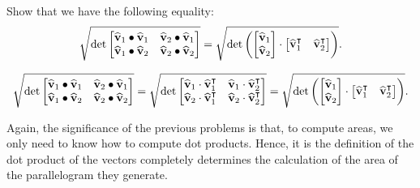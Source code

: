 \documentclass[newpage,hints,handout]{ximera}
\begin{document}
\begin{problem}
Show that we have the following equality:
\[
\sqrt{
  \det
\begin{bmatrix}
\hat{\mathbf v}_{1}\bullet\hat{\mathbf v}_{1} & \hat{\mathbf v}_{2}\bullet\hat{\mathbf v}_{1}\\
\hat{\mathbf v}_{1}\bullet\hat{\mathbf v}_{2} & \hat{\mathbf v}_{2}\bullet\hat{\mathbf v}_{2}%
\end{bmatrix}}
=
\sqrt{
  \det\left(
\begin{bmatrix}
\hat{\mathbf v}_{1} \\
\hat{\mathbf v}_{2}
\end{bmatrix}
\cdot
\begin{bmatrix}
\hat{\mathbf v}_{1}^\transpose  & \hat{\mathbf v}_{2}^\transpose 
\end{bmatrix}\right)}.
\]

\begin{freeResponse}
\[
\sqrt{
  \det
\begin{bmatrix}
\hat{\mathbf v}_{1}\bullet\hat{\mathbf v}_{1} & \hat{\mathbf v}_{2}\bullet\hat{\mathbf v}_{1}\\
\hat{\mathbf v}_{1}\bullet\hat{\mathbf v}_{2} & \hat{\mathbf v}_{2}\bullet\hat{\mathbf v}_{2}%
\end{bmatrix}}
=\sqrt{
  \det
\begin{bmatrix}
\hat{\mathbf v}_{1}\cdot \hat{\mathbf v}_{1}^\transpose & \hat{\mathbf v}_{1}\cdot \hat{\mathbf v}_{2}^\transpose\\
\hat{\mathbf v}_{2}\cdot \hat{\mathbf v}_{1}^\transpose & \hat{\mathbf v}_{2}\cdot \hat{\mathbf v}_{2}^\transpose%
\end{bmatrix}}
=\sqrt{
  \det\left(
\begin{bmatrix}
\hat{\mathbf v}_{1} \\
\hat{\mathbf v}_{2}
\end{bmatrix}
\cdot
\begin{bmatrix}
\hat{\mathbf v}_{1}^\transpose  & \hat{\mathbf v}_{2}^\transpose 
\end{bmatrix}\right)}.
\]
\end{freeResponse}
\end{problem}

Again, the significance of the previous problems is that, to compute
areas, we only need to know how to compute dot products. Hence, it is
the definition of the dot product of the vectors completely determines
the calculation of the area of the parallelogram they generate.
\end{document}

